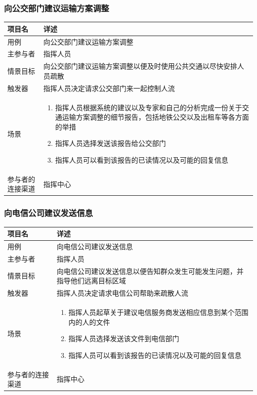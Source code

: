 \documentclass{ctexrep}
\begin{document}
\subsubsection{向公交部门建议运输方案调整}
\begin{longtable}{p{2cm} | p{10cm}}
\hline
项目名 & 详述 \\
\hline
\hline
用例 & 向公交部门建议运输方案调整\\
\hline
主参与者 & 指挥人员 \\
\hline
情景目标 & 向公交部门建议运输方案调整以便及时使用公共交通以尽快安排人员疏散 \\
\hline
触发器 & 指挥人员决定请求公交部门来一起控制人流 \\
\hline
场景 & \begin{enumerate}
	\item 指挥人员根据系统的建议以及专家和自己的分析完成一份关于交通运输方案调整的细节报告，包括地铁公交以及出租车等各方面的举措
	\item 指挥人员选择发送该报告给公交部门
	\item 指挥人员可以看到该报告的已读情况以及可能的回复信息
\end{enumerate} \\
\hline
参与者的连接渠道 & 指挥中心\\
\hline
\end{longtable}

\subsubsection{向电信公司建议发送信息}
\begin{longtable}{p{2cm} | p{10cm}}
\hline
项目名 & 详述 \\
\hline
\hline
用例 & 向电信公司建议发送信息\\
\hline
主参与者 &  指挥人员\\
\hline
情景目标 &向电信公司建议发送信息以便告知群众发生可能发生问题，并指导他们远离目标区域  \\
\hline
触发器 & 指挥人员决定请求电信公司帮助来疏散人流 \\
\hline
场景 & \begin{enumerate}
	\item 指挥人员起草关于建议电信服务商发送相应信息到某个范围内的人的文件
	\item 指挥人员选择发送该文件到电信部门
	\item 指挥人员可以看到该报告的已读情况以及可能的回复信息
\end{enumerate} \\
\hline
参与者的连接渠道 & 指挥中心 \\
\hline
\end{longtable}
\end{document}
